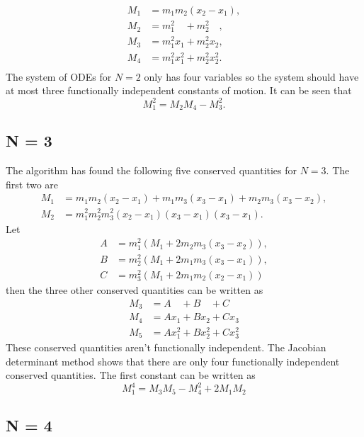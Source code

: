 \documentclass[english,master]{liumaiex}
\theoremstyle{plain}
\theoremstyle{definition}
\begin{document}
\begin{align}
	M_1 &= m_1 m_2 (x_2 - x_1), \\
	M_2 &= m_1^2\phantom{x_1} + m_2^2\phantom{x_2}, \\
	M_3 &= m_1^2 x_1 + m_2^2 x_2, \\
	M_4 &= m_1^2 x_1^2 + m_2^2 x_2^2. \\
\end{align}
%
The system of ODEs for $N = 2$ only has four variables so the system should have at most three functionally independent constants of motion. It can be seen that
\begin{equation}
	M_1^2 = M_2M_4 - M_3^2.
\end{equation}

\subsection*{N = 3}

The algorithm has found the following five conserved quantities for $N = 3$.  The first two are
\begin{align}
	M_1 &= m_1m_2(x_2 - x_1) + m_1m_3(x_3 - x_1) + m_2m_3(x_3 - x_2), \\
	M_2 &= m_1^2m_2^2m_3^2(x_2 - x_1)(x_3 - x_1)(x_3 - x_1).
\end{align}
Let
\begin{align}
	A & = m_1^2(M_1 + 2m_2m_3(x_3-x_2)), \\
	B & = m_2^2(M_1 + 2m_1m_3(x_3-x_1)), \\
	C & = m_3^2(M_1 + 2m_1m_2(x_2-x_1))
\end{align}
then the three other conserved quantities can be written as
\begin{align}
	M_3 &= A\phantom{x_1} + B\phantom{x_2} + C\phantom{x_3} \\
	M_4 &= Ax_1 + Bx_2 + Cx_3 \\
	M_5 &= Ax_1^2 + Bx_2^2 + Cx_3^2
\end{align}
These conserved quantities aren't functionally independent. The Jacobian determinant method shows that there are only four functionally independent conserved quantities. The first constant can be written as
\begin{equation}
	M_1^4 = M_3M_5 - M_4^2 + 2M_1M_2
\end{equation}

\subsection*{N = 4}
\end{document}
